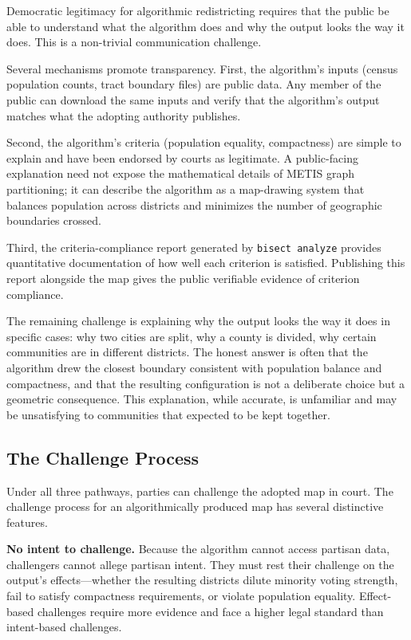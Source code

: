 Democratic legitimacy for algorithmic redistricting requires that the public
be able to understand what the algorithm does and why the output looks the way
it does.  This is a non-trivial communication challenge.

Several mechanisms promote transparency.  First, the algorithm's inputs
(census population counts, tract boundary files) are public data.  Any
member of the public can download the same inputs and verify that the
algorithm's output matches what the adopting authority publishes.

Second, the algorithm's criteria (population equality, compactness) are
simple to explain and have been endorsed by courts as legitimate.  A
public-facing explanation need not expose the mathematical details of METIS
graph partitioning; it can describe the algorithm as a map-drawing system
that balances population across districts and minimizes the number of
geographic boundaries crossed.

Third, the criteria-compliance report generated by \texttt{bisect analyze}
provides quantitative documentation of how well each criterion is satisfied.
Publishing this report alongside the map gives the public verifiable evidence
of criterion compliance.

The remaining challenge is explaining why the output looks the way it does
in specific cases: why two cities are split, why a county is divided, why
certain communities are in different districts.  The honest answer is often
that the algorithm drew the closest boundary consistent with population
balance and compactness, and that the resulting configuration is not a
deliberate choice but a geometric consequence.  This explanation, while
accurate, is unfamiliar and may be unsatisfying to communities that expected
to be kept together.

\subsection{The Challenge Process}

Under all three pathways, parties can challenge the adopted map in court.
The challenge process for an algorithmically produced map has several
distinctive features.

\textbf{No intent to challenge.}  Because the algorithm cannot access
partisan data, challengers cannot allege partisan intent.  They must rest
their challenge on the output's effects---whether the resulting districts
dilute minority voting strength, fail to satisfy compactness requirements,
or violate population equality.  Effect-based challenges require more
evidence and face a higher legal standard than intent-based challenges.

